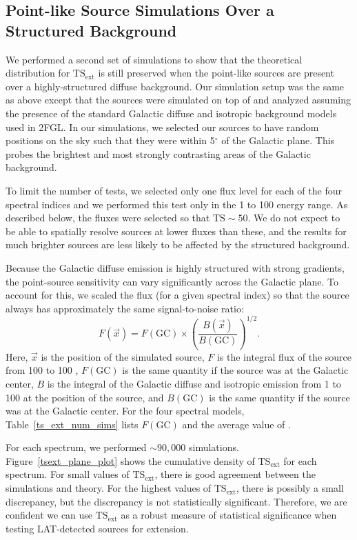 \documentclass[12pt,preprint]{aastex}
\newcommand{\mev}{\text{MeV}\xspace}
\newcommand{\gev}{\text{GeV}\xspace}
\newcommand{\tsext}{{\ensuremath{\text{TS}_{\text{ext}}}}\xspace}
\newcommand{\ts}{\text{TS}\xspace}
\newcommand{\degree}{\ensuremath{^\circ}\xspace}
\begin{document}
\subsection{Point-like Source Simulations Over a Structured Background}
\label{validation_over_plane}

We performed a second set of simulations to show that the theoretical distribution
for \tsext is still preserved when the point-like sources are present over
a highly-structured diffuse background.
Our simulation setup was the same as above except that the sources were
simulated on top of and analyzed assuming the presence of the standard
Galactic diffuse and isotropic background models used in 2FGL.  In our
simulations, we selected our sources to have random positions on the sky
such that they were within 5\degree of the Galactic plane. This probes the 
brightest and most strongly contrasting areas of the Galactic background.

To limit the number of tests, we selected only one flux
level for each of the four spectral indices and we performed
this test only in the 1 \gev to 100 \gev energy range. 
As described below, the fluxes were selected so that $\ts\sim50$. We do not
expect to be able to spatially resolve sources 
at lower fluxes than these, and the results for much brighter sources
are less likely to be affected by the 
structured background.

Because the Galactic diffuse emission is highly structured with
strong gradients, the point-source
sensitivity can vary significantly across the Galactic plane.
To account for this, we scaled the flux (for a given spectral index)
so that the source always has approximately the same signal-to-noise ratio:
\begin{equation}
  \label{scale_flux_by_background}
  F(\vec{x}) = F(\text{GC}) \times \left(
  \frac{B(\vec{x})}{B(\text{GC})}\right)^{1/2}.
\end{equation}
Here, $\vec{x}$ is the position of the simulated source, $F$ is the integral
flux of the source from 100 \mev to 100 \gev, $F(\text{GC})$
is the same quantity if the source was at the Galactic center, $B$
is the integral of the Galactic diffuse and isotropic emission
from 1 \gev to 100 \gev at the position of the source, and $B(\text{GC})$ is the same quantity
if the source was at the Galactic center.  For the four spectral models,
Table~\ref{ts_ext_num_sims} lists $F(\text{GC})$ and the average value of \ts.

For each spectrum, we performed $\sim90,000$ simulations.
Figure~\ref{tsext_plane_plot} shows the cumulative density
of \tsext for each spectrum. For small values of \tsext,
there is good agreement between the simulations and
theory.  For the highest values of \tsext, there is possibly
a small discrepancy, but the discrepancy is not statistically significant.
Therefore, we are confident we can use \tsext as a robust measure of
statistical significance when testing LAT-detected sources for extension.
\end{document}
